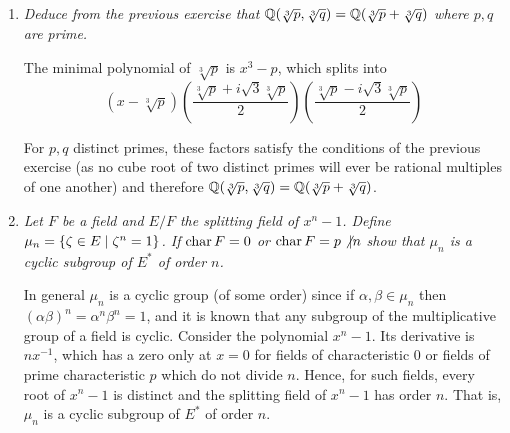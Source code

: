 \documentclass[10pt]{article}
\begin{document}
\begin{enumerate}
\item \emph{Deduce from the previous exercise that $\mathbb{Q}(\sqrt[3]{p}, \sqrt[3]{q}) = \mathbb{Q}(\sqrt[3]{p} + \sqrt[3]{q})$ where $p,q$ are prime.}

The minimal polynomial of $\sqrt[3]{p}$ is $x^3 - p$, which splits into
\[
(x - \sqrt[3]{p})\left(\frac{\sqrt[3]{p} + i\sqrt{3}\sqrt[3]{p}}{2}\right)\left(\frac{\sqrt[3]{p} - i\sqrt{3}\sqrt[3]{p}}{2}\right)
\]

For $p,q$ distinct primes, these factors satisfy the conditions of the previous exercise (as no cube root of two distinct primes will ever be rational multiples of one another) and therefore $\mathbb{Q}(\sqrt[3]{p}, \sqrt[3]{q}) = \mathbb{Q}(\sqrt[3]{p} + \sqrt[3]{q})$.

\item \emph{Let $F$ be a field and $E/F$ the splitting field of $x^n-1$.  Define $\mu_n = \left\{ \zeta \in E \mid \zeta^n = 1 \right\}$.  If $\operatorname{char} F = 0$ or $\operatorname{char} F = p \not| n$ show that $\mu_n$ is a cyclic subgroup of $E^\ast$ of order $n$.}

In general $\mu_n$ is a cyclic group (of some order) since if $\alpha, \beta \in \mu_n$ then $(\alpha\beta)^n = \alpha^n\beta^n = 1$, and it is known that any subgroup of the multiplicative group of a field is cyclic.  Consider the polynomial $x^n - 1$.  Its derivative is $nx^{-1}$, which has a zero only at $x=0$ for fields of characteristic $0$ or fields of prime characteristic $p$ which do not divide $n$.  Hence, for such fields, every root of $x^n-1$ is distinct and the splitting field of $x^n-1$ has order $n$.  That is, $\mu_n$ is a cyclic subgroup of $E^\ast$ of order $n$.

\end{enumerate}
\end{document}
